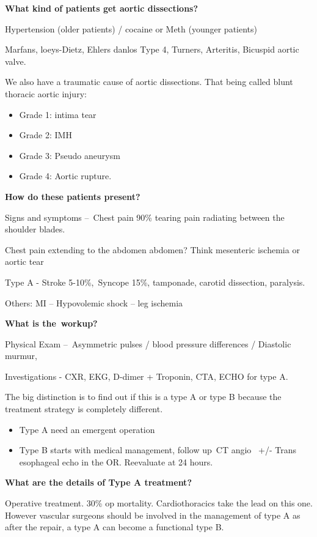\documentclass[
]{book}
\begin{document}
\textbf{What kind of patients get aortic dissections?}

Hypertension (older patients) / cocaine or Meth (younger patients)~

Marfans, loeys-Dietz, Ehlers danlos Type 4, Turners, Arteritis, Bicuspid
aortic valve.

We also have a traumatic cause of aortic dissections. That being called
blunt thoracic aortic injury:

\begin{itemize}
\item
  Grade 1: intima tear
\item
  Grade 2: IMH
\item
  Grade 3: Pseudo aneurysm
\item
  Grade 4: Aortic rupture.
\end{itemize}

\textbf{How do these patients present?}

Signs and symptoms --~Chest pain 90\% tearing pain radiating between the
shoulder blades.~

Chest pain extending to the abdomen abdomen? Think mesenteric ischemia
or aortic tear

Type A - Stroke 5-10\%,~Syncope 15\%, tamponade, carotid dissection,
paralysis.~

Others: MI -- Hypovolemic shock -- leg ischemia

\textbf{What is the~workup?}

Physical Exam --~Asymmetric pulses / blood pressure differences /
Diastolic murmur,

Investigations - CXR, EKG, D-dimer + Troponin, CTA, ECHO for type A.~

The big distinction is to find out if this is a type A or type B because
the treatment strategy is completely different.

\begin{itemize}
\item
  Type A need an emergent operation
\item
  Type B starts with medical management, follow up~CT angio~ +/- Trans
  esophageal echo in the OR. Reevaluate at 24 hours.~
\end{itemize}

\textbf{What are the details of Type A treatment?}

Operative treatment. 30\% op mortality. Cardiothoracics take the lead on
this one. However vascular surgeons should be involved in the management
of type A as after the repair, a type A can become a functional type B.
\end{document}

